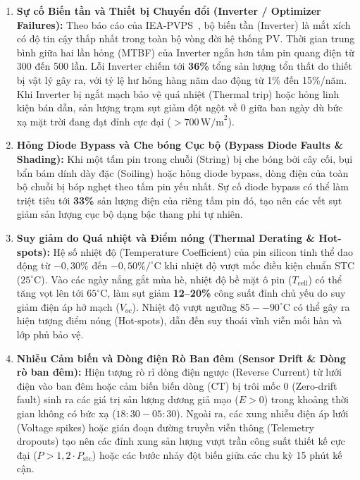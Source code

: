 \documentclass[12pt, a4paper]{report}
\begin{document}
\begin{enumerate}[label=\arabic*., leftmargin=*]
    \item \textbf{Sự cố Biến tần và Thiết bị Chuyển đổi (Inverter / Optimizer Failures):}
    Theo báo cáo của IEA-PVPS~\cite{iea2023pvps}, bộ biến tần (Inverter) là mắt xích có độ tin cậy thấp nhất trong toàn bộ vòng đời hệ thống PV. Thời gian trung bình giữa hai lần hỏng (MTBF) của Inverter ngắn hơn tấm pin quang điện từ 300 đến 500 lần. Lỗi Inverter chiếm tới \textbf{36\%} tổng sản lượng tổn thất do thiết bị vật lý gây ra, với tỷ lệ hư hỏng hàng năm dao động từ 1\% đến 15\%/năm. Khi Inverter bị ngắt mạch bảo vệ quá nhiệt (Thermal trip) hoặc hỏng linh kiện bán dẫn, sản lượng trạm sụt giảm đột ngột về 0 giữa ban ngày dù bức xạ mặt trời đang đạt đỉnh cực đại ($> 700 \, \text{W/m}^2$).

    \item \textbf{Hỏng Diode Bypass và Che bóng Cục bộ (Bypass Diode Faults \& Shading):}
    Khi một tấm pin trong chuỗi (String) bị che bóng bởi cây cối, bụi bẩn bám dính dày đặc (Soiling) hoặc hỏng diode bypass, dòng điện của toàn bộ chuỗi bị bóp nghẹt theo tấm pin yếu nhất. Sự cố diode bypass có thể làm triệt tiêu tới \textbf{33\%} sản lượng điện của riêng tấm pin đó, tạo nên các vết sụt giảm sản lượng cục bộ dạng bậc thang phi tự nhiên.

    \item \textbf{Suy giảm do Quá nhiệt và Điểm nóng (Thermal Derating \& Hot-spots):}
    Hệ số nhiệt độ (Temperature Coefficient) của pin silicon tinh thể dao động từ $-0{,}30\%$ đến $-0{,}50\%/^\circ\text{C}$ khi nhiệt độ vượt mốc điều kiện chuẩn STC ($25^\circ\text{C}$). Vào các ngày nắng gắt mùa hè, nhiệt độ bề mặt ô pin ($T_{\text{cell}}$) có thể tăng vọt lên tới $65^\circ\text{C}$, làm sụt giảm \textbf{12--20\%} công suất đỉnh chủ yếu do suy giảm điện áp hở mạch ($V_{oc}$). Nhiệt độ vượt ngưỡng $85--90^\circ\text{C}$ có thể gây ra hiện tượng điểm nóng (Hot-spots), dẫn đến suy thoái vĩnh viễn mối hàn và lớp phủ bảo vệ.

    \item \textbf{Nhiễu Cảm biến và Dòng điện Rò Ban đêm (Sensor Drift \& Dòng rò ban đêm):}
    Hiện tượng rò rỉ dòng điện ngược (Reverse Current) từ lưới điện vào ban đêm hoặc cảm biến biến dòng (CT) bị trôi mốc 0 (Zero-drift fault) sinh ra các giá trị sản lượng dương giả mạo ($E > 0$) trong khoảng thời gian không có bức xạ ($18:30 - 05:30$). Ngoài ra, các xung nhiễu điện áp lưới (Voltage spikes) hoặc gián đoạn đường truyền viễn thông (Telemetry dropouts) tạo nên các đỉnh xung sản lượng vượt trần công suất thiết kế cực đại ($P > 1{,}2 \cdot P_{\text{stc}}$) hoặc các bước nhảy đột biến giữa các chu kỳ 15 phút kế cận.
\end{enumerate}
\end{document}
